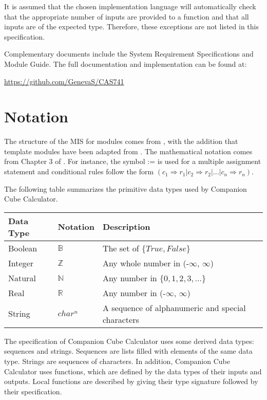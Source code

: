 \documentclass[12pt, titlepage]{article}
\newcommand{\progname}{Companion Cube Calculator}
\begin{document}
It is assumed that the chosen implementation language will automatically check 
that the appropriate number of inputs are provided to a function and that all 
inputs are of the expected type. Therefore, these exceptions are not listed in 
this specification.

Complementary documents include the System Requirement Specifications
and Module Guide. The full documentation and implementation can be
found at:
\begin{center}
	\href{https://github.com/GenevaS/CAS741}{https://github.com/GenevaS/CAS741}
\end{center}

\newpage

\section{Notation}
The structure of the MIS for modules comes from \citet{HoffmanAndStrooper1995},
with the addition that template modules have been adapted from
\cite{GhezziEtAl2003}.  The mathematical notation comes from Chapter 3 of
\citet{HoffmanAndStrooper1995}.  For instance, the symbol := is used for a
multiple assignment statement and conditional rules follow the form $(c_1
\Rightarrow r_1 | c_2 \Rightarrow r_2 | ... | c_n \Rightarrow r_n )$.

The following table summarizes the primitive data types used by \progname. 

\begin{center}
\renewcommand{\arraystretch}{1.2}
\noindent 
\begin{tabular}{l l p{7.5cm}} 
\toprule 
\textbf{Data Type} & \textbf{Notation} & \textbf{Description}\\ 
\midrule
Boolean & $\mathbb{B}$ & The set of $\{True, False\}$\\
Integer & $\mathbb{Z}$ & Any whole number in (-$\infty$, $\infty$)\\
Natural & $\mathbb{N}$ & Any number in $\{0, 1, 2, 3, ...\}$\\
Real & $\mathbb{R}$ & Any number in (-$\infty$, $\infty$)\\
\multirow{2}{1cm}{String} & \multirow{2}{1cm}{$char^n$} & A sequence of 
alphanumeric and special characters\\
\bottomrule
\end{tabular} 
\end{center}

\noindent
The specification of \progname{} uses some derived data types: sequences and 
strings. Sequences are lists filled with elements of the same data type. Strings
are sequences of characters. In addition, \progname{} uses functions, which
are defined by the data types of their inputs and outputs. Local functions are
described by giving their type signature followed by their specification.
\end{document}
